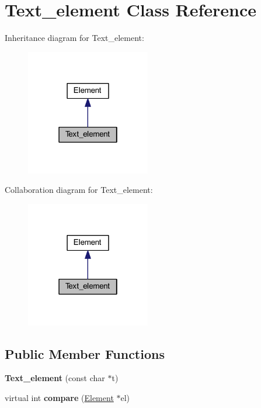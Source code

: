 \hypertarget{class_text__element}{\section{Text\-\_\-element Class Reference}
\label{db/d3d/class_text__element}
}


Inheritance diagram for Text\-\_\-element\-:\nopagebreak
\begin{figure}[H]
\begin{center}
\leavevmode
\includegraphics[width=154pt]{d8/d25/class_text__element__inherit__graph}
\end{center}
\end{figure}


Collaboration diagram for Text\-\_\-element\-:\nopagebreak
\begin{figure}[H]
\begin{center}
\leavevmode
\includegraphics[width=154pt]{db/d7d/class_text__element__coll__graph}
\end{center}
\end{figure}
\subsection*{Public Member Functions}
\begin{DoxyCompactItemize}
\item 
\hypertarget{class_text__element_a3c2586285468c3fede70e5a4812c8517}{{\bfseries Text\-\_\-element} (const char $\ast$t)}\label{db/d3d/class_text__element_a3c2586285468c3fede70e5a4812c8517}

\item 
\hypertarget{class_text__element_a9794e999b859accdceda478c74b2c156}{virtual int {\bfseries compare} (\hyperlink{class_element}{Element} $\ast$el)}\label{db/d3d/class_text__element_a9794e999b859accdceda478c74b2c156}

\end{DoxyCompactItemize}
